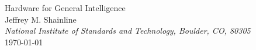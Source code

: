 \documentclass[]{article}
\begin{document}
    
\begin{center}
\LARGE{Hardware for General Intelligence}\\ 
\vspace{0.3em}
\large Jeffrey M. Shainline\\
\vspace{0.0em}
\textit{\small National Institute of Standards and Technology, Boulder, CO, 80305}\\
\vspace{0.3em}
\small \today

\begin{abstract}

\vspace{3em}
\end{abstract}

\end{center}

\begin{multicols}{2}

\setcounter{tocdepth}{2}
\setcounter{secnumdepth}{4}
\tableofcontents





%

%

%

%

%




\end{multicols}
\end{document}
